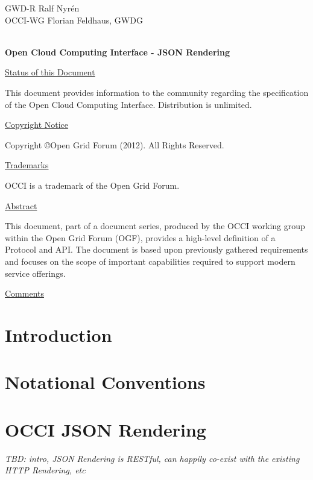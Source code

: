 \documentclass[10pt,a4paper]{article}
\begin{document}
\thispagestyle{empty}

GWD-R \hfill Ralf Nyrén \\
OCCI-WG \hfill Florian Feldhaus, GWDG\\
\\

\vspace*{0.5in}

\begin{Large}
\textbf{Open Cloud Computing Interface - JSON Rendering}
\end{Large}

\vspace*{0.5in}

\underline{Status of this Document}

This document provides information to the community regarding the
specification of the Open Cloud Computing Interface. Distribution is
unlimited.

\underline{Copyright Notice}

Copyright \copyright Open Grid Forum (2012). All Rights Reserved.

\underline{Trademarks}

OCCI is a trademark of the Open Grid Forum.

\underline{Abstract}

This document, part of a document series, produced by the OCCI working
group within the Open Grid Forum (OGF), provides a high-level
definition of a Protocol and API. The document is based upon
previously gathered requirements and focuses on the scope of important
capabilities required to support modern service offerings.

\underline{Comments}
\newcommand{\ralf}[1]{\textcolor{red}{RN: #1}}
\newcommand{\andy}[1]{\textcolor{green}{AE: #1}}

\newpage
\tableofcontents
\newpage

\section{Introduction}
%

\section{Notational Conventions}


\section{OCCI JSON Rendering}
{\em TBD: intro, JSON Rendering is RESTful, can happily co-exist with the
existing HTTP Rendering, etc}
\end{document}
